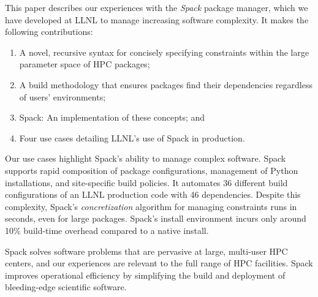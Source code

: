 This paper describes our experiences with the {\it Spack} package manager,
which we have developed at LLNL to manage increasing software complexity.
It makes the following contributions:
\begin{enumerate}
\item A novel, recursive syntax for concisely specifying constraints within
      the large parameter space of HPC packages;
\item A build methodology that ensures packages find their dependencies
      regardless of users' environments;
\item Spack: An implementation of these concepts; and
\item Four use cases detailing LLNL's use of Spack in production.
\end{enumerate}
\noindent
Our use cases highlight Spack's ability to manage complex software.
%
Spack supports rapid composition of package configurations, management 
of Python installations, and site-specific build policies. 
%
It automates 36 different build configurations of an LLNL
production code with 46 dependencies.
Despite this complexity, Spack's {\it concretization} algorithm
for managing constraints runs in seconds, even for
large packages. Spack's install environment incurs only around
10\% build-time overhead compared to a native install.

Spack solves software problems that are pervasive at large,
multi-user HPC centers, and our experiences are relevant to the
full range of HPC facilities.
Spack improves operational efficiency by simplifying the
build and deployment of bleeding-edge scientific software.  





